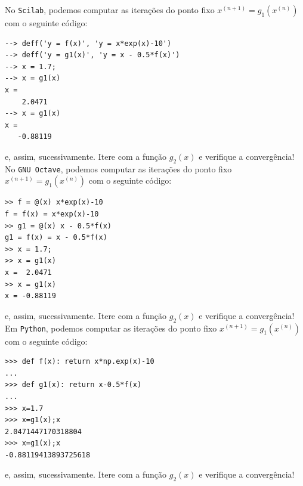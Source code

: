 \begin{ex}
\ifisscilab
No \verb+Scilab+, podemos computar as iterações do ponto fixo $x^{(n+1)} = g_1(x^{(n)})$ com o seguinte código:
\begin{verbatim}
--> deff('y = f(x)', 'y = x*exp(x)-10')
--> deff('y = g1(x)', 'y = x - 0.5*f(x)')
--> x = 1.7;
--> x = g1(x)
x =  
    2.0471
--> x = g1(x)
x = 
   -0.88119
\end{verbatim}
e, assim, sucessivamente. Itere com a função $g_2(x)$ e verifique a convergência!
\fi
\ifisoctave
No \verb+GNU Octave+, podemos computar as iterações do ponto fixo $x^{(n+1)} = g_1(x^{(n)})$ com o seguinte código:
\begin{verbatim}
>> f = @(x) x*exp(x)-10
f = f(x) = x*exp(x)-10
>> g1 = @(x) x - 0.5*f(x)
g1 = f(x) = x - 0.5*f(x)
>> x = 1.7;
>> x = g1(x)
x =  2.0471
>> x = g1(x)
x = -0.88119
\end{verbatim}
e, assim, sucessivamente. Itere com a função $g_2(x)$ e verifique a convergência!
\fi
\ifispython
Em \verb+Python+, podemos computar as iterações do ponto fixo $x^{(n+1)} = g_1(x^{(n)})$ com o seguinte código:
\begin{verbatim}
>>> def f(x): return x*np.exp(x)-10
... 
>>> def g1(x): return x-0.5*f(x)
... 
>>> x=1.7
>>> x=g1(x);x
2.0471447170318804
>>> x=g1(x);x
-0.88119413893725618
\end{verbatim}
e, assim, sucessivamente. Itere com a função $g_2(x)$ e verifique a convergência!
\fi
\end{ex}








